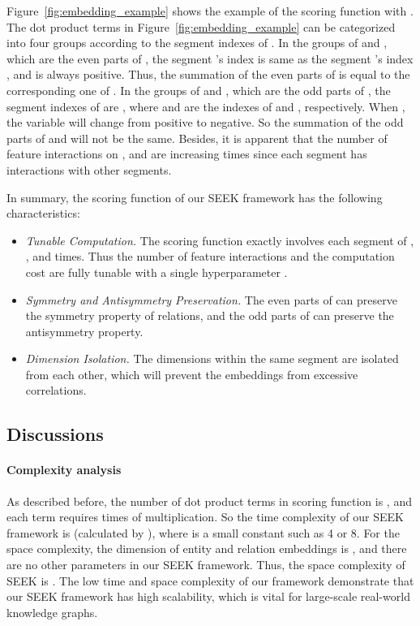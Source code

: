 \documentclass[11pt,a4paper]{article}
\begin{document}
Figure~\ref{fig:embedding_example} shows the example of the scoring function  with . The dot product terms in Figure~\ref{fig:embedding_example} can be categorized into four groups according to the segment indexes of .  
In the groups of  and , which are the even parts of , the segment 's index  is same as the segment 's index , and  is always positive. Thus, the summation  of the even parts of   is equal to the corresponding one  of . 
In the groups of  and , which are the odd parts of , the segment indexes of  are , where  and  are the indexes of  and , respectively. When , the variable  will change from positive to negative. So the summation of the odd parts of  and  will not be the same. Besides, it is apparent that the number of feature interactions on ,  and  are increasing  times since each segment has  interactions with other segments.

In summary, the scoring function  of our SEEK framework has the following characteristics:
\begin{itemize}[label={-}]

	
	\item \textit{Tunable Computation.} The scoring function exactly involves each segment of , , and   times. Thus the number of feature interactions and the computation cost are fully tunable with a single hyperparameter .
	
	\item \textit{Symmetry and Antisymmetry Preservation.}  The even parts of  can preserve the symmetry property of relations, and the odd parts of  can preserve the antisymmetry property.
	
	\item \textit{Dimension Isolation.}  The dimensions within the same segment are isolated from each other, which will prevent the embeddings from excessive correlations.\end{itemize}

\begin{comment}
\begin{figure*}[!h]
\centering
\texttt{[image: figure/SEG-Example-8-2]}
\caption{Scoring Function with }
\label{fig:embedding_example_8}
\end{figure*}
\end{comment}

\subsection{Discussions}
\paragraph{Complexity analysis}
As described before, the number of dot product terms in scoring function  is , and each term requires  times of multiplication. So the time complexity of our SEEK framework is  (calculated by ), where  is a small constant such as 4 or 8. For the space complexity, the dimension of entity and relation embeddings is , and there are no other parameters in our SEEK framework. Thus, the space complexity of SEEK is . The low time and space complexity of our framework demonstrate that our SEEK framework has high scalability, which is vital for large-scale real-world knowledge graphs.
\end{document}
